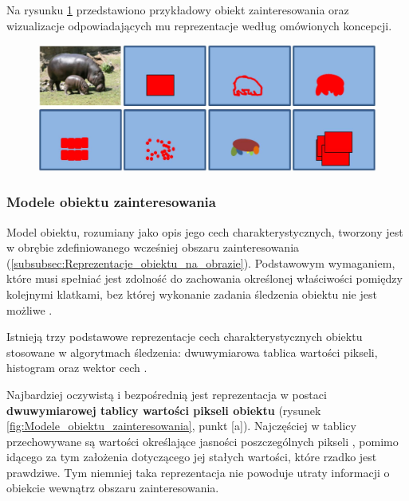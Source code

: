 Na rysunku \ref{fig:Reprezentacje_obiektu_na_obrazie} przedstawiono przykładowy obiekt zainteresowania oraz wizualizacje odpowiadających mu reprezentacje według omówionych koncepcji.

\begin{figure}[!htb]
	\begin{center}
		\includegraphics[width=12cm]{images/target_region_representation.png}
	\end{center}	
\label{fig:Reprezentacje_obiektu_na_obrazie}
\end{figure}

\subsubsection{Modele obiektu zainteresowania}
\label{subsubsec:Modele_obiektu_zainteresowania}

Model obiektu, rozumiany jako opis jego cech charakterystycznych, tworzony jest w obrębie zdefiniowanego wcześniej obszaru zainteresowania (\ref{subsubsec:Reprezentacje_obiektu_na_obrazie}). Podstawowym wymaganiem, które musi spełniać jest zdolność do zachowania określonej właściwości pomiędzy kolejnymi klatkami, bez której wykonanie zadania śledzenia obiektu nie jest możliwe \cite{Smeulders2010}.

Istnieją trzy podstawowe reprezentacje cech charakterystycznych obiektu stosowane w algorytmach śledzenia: dwuwymiarowa tablica wartości pikseli, histogram oraz wektor cech \cite{Smeulders2010}.

Najbardziej oczywistą i bezpośrednią jest reprezentacja w postaci \textbf{dwuwymiarowej tablicy wartości pikseli obiektu} (rysunek \ref{fig:Modele_obiektu_zainteresowania}, punkt [a]). Najczęściej w tablicy przechowywane są wartości określające jasności poszczególnych pikseli \cite{Smeulders2010}, pomimo idącego za tym założenia dotyczącego jej stałych wartości, które rzadko jest prawdziwe. Tym niemniej taka reprezentacja nie powoduje utraty informacji o obiekcie wewnątrz obszaru zainteresowania.

